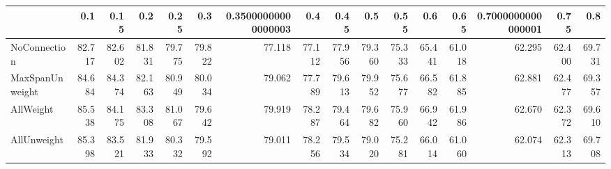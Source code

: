 \begin{tabular}{lrrrrrrrrrrrrrrr}
\toprule
{} &    0.1 &   0.15 &    0.2 &   0.25 &    0.3 & 0.35000000000000003 &    0.4 &   0.45 &    0.5 &   0.55 &    0.6 &   0.65 & 0.7000000000000001 &   0.75 &    0.8 \\
\midrule
NoConnection    & 82.717 & 82.602 & 81.831 & 79.775 & 79.822 &              77.118 & 77.112 & 77.956 & 79.360 & 75.333 & 65.441 & 61.018 &             62.295 & 62.400 & 69.731 \\
MaxSpanUnweight & 84.684 & 84.374 & 82.163 & 80.949 & 80.034 &              79.062 & 77.789 & 79.613 & 79.952 & 75.677 & 66.582 & 61.885 &             62.881 & 62.477 & 69.357 \\
AllWeight       & 85.538 & 84.175 & 83.308 & 81.067 & 79.642 &              79.919 & 78.287 & 79.464 & 79.682 & 75.960 & 66.942 & 61.986 &             62.670 & 62.372 & 69.610 \\
AllUnweight     & 85.398 & 83.521 & 81.933 & 80.332 & 79.592 &              79.011 & 78.256 & 79.534 & 79.020 & 75.281 & 66.014 & 61.060 &             62.074 & 62.313 & 69.708 \\
\bottomrule
\end{tabular}
